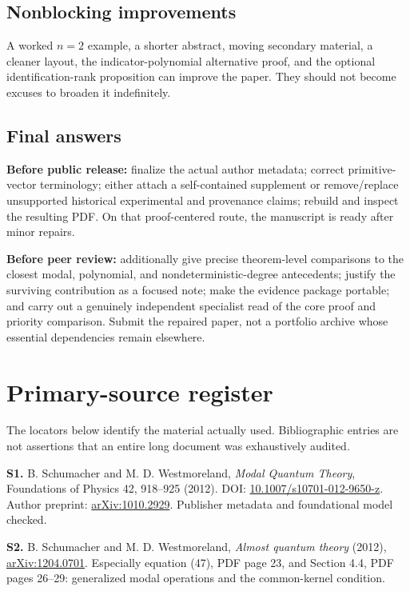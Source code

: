 \documentclass[
  11pt,
]{article}
\begin{document}
\subsection{Nonblocking improvements}\label{nonblocking-improvements}

A worked \(n=2\) example, a shorter abstract, moving secondary material,
a cleaner layout, the indicator-polynomial alternative proof, and the
optional identification-rank proposition can improve the paper. They
should not become excuses to broaden it indefinitely.

\subsection{Final answers}\label{final-answers}

\textbf{Before public release:} finalize the actual author metadata;
correct primitive-vector terminology; either attach a self-contained
supplement or remove/replace unsupported historical experimental and
provenance claims; rebuild and inspect the resulting PDF. On that
proof-centered route, the manuscript is ready after minor repairs.

\textbf{Before peer review:} additionally give precise theorem-level
comparisons to the closest modal, polynomial, and
nondeterministic-degree antecedents; justify the surviving contribution
as a focused note; make the evidence package portable; and carry out a
genuinely independent specialist read of the core proof and priority
comparison. Submit the repaired paper, not a portfolio archive whose
essential dependencies remain elsewhere.

\newpage

\section{Primary-source register}\label{primary-source-register}

The locators below identify the material actually used. Bibliographic
entries are not assertions that an entire long document was exhaustively
audited.

\textbf{S1.} B. Schumacher and M. D. Westmoreland, \emph{Modal Quantum
Theory}, Foundations of Physics 42, 918--925 (2012). DOI:
\href{https://doi.org/10.1007/s10701-012-9650-z}{10.1007/s10701-012-9650-z}.
Author preprint:
\href{https://arxiv.org/abs/1010.2929}{arXiv:1010.2929}. Publisher
metadata and foundational model checked.

\textbf{S2.} B. Schumacher and M. D. Westmoreland, \emph{Almost quantum
theory} (2012), \href{https://arxiv.org/abs/1204.0701}{arXiv:1204.0701}.
Especially equation (47), PDF page 23, and Section 4.4, PDF pages
26--29: generalized modal operations and the common-kernel condition.
\end{document}
